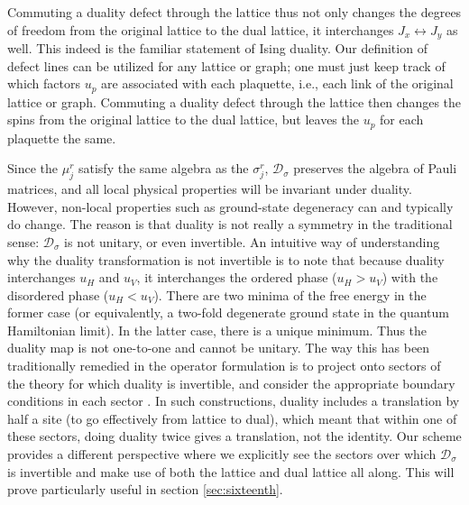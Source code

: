 \documentclass[11pt]{article}
\newcommand{\D}{{\mathcal{D}}}
\numberwithin{equation}{section}		%
\begin{document}
Commuting a duality defect through the lattice thus not only changes the degrees of freedom from the original lattice to the dual lattice, it interchanges $J_x\leftrightarrow J_y$ as well. This indeed is the familiar statement of Ising duality. Our definition of defect lines can be utilized for any lattice or graph; one must just keep track of which factors $u_p$ are associated with each plaquette, i.e., each link of the original lattice or graph. Commuting a duality defect through the lattice then changes the spins from the original lattice to the dual lattice, but leaves the $u_p$ for each plaquette the same.



Since the $\mu_j^r$ satisfy the same algebra as the $\sigma_j^r$, $\mathcal{D}_\sigma$ preserves the algebra of Pauli matrices, and all local physical properties will be invariant under duality. However, non-local properties such as ground-state degeneracy can and typically do change.
The reason is that duality is not really a symmetry in the traditional sense: ${\mathcal D}_\sigma$ is not unitary, or even invertible. An intuitive way of understanding why the duality transformation is not invertible is to note that because duality interchanges $u_H$ and $u_V$, it interchanges the ordered phase ($u_H>u_V$) with the disordered phase ($u_H<u_V$). There are two minima of the free energy in the former case (or equivalently, a two-fold degenerate ground state in the quantum Hamiltonian limit). In the latter case, there is a unique minimum. Thus the duality map is not one-to-one and cannot be unitary.
The way this has been traditionally remedied in the operator formulation is to project onto sectors of the theory for which duality is invertible, and consider the appropriate boundary conditions in each sector \cite{KadanoffCeva,Pasquier1990,Levy1991}. In such constructions, duality includes a translation by half a site (to go effectively from lattice to dual), which meant that within one of these sectors, doing duality twice gives a translation, not the identity.  Our scheme provides a different perspective where we explicitly see the sectors over which $\D_\sigma$ is invertible and make use of both the lattice and dual lattice all along. This will prove particularly useful in section \ref{sec:sixteenth}.
\end{document}
